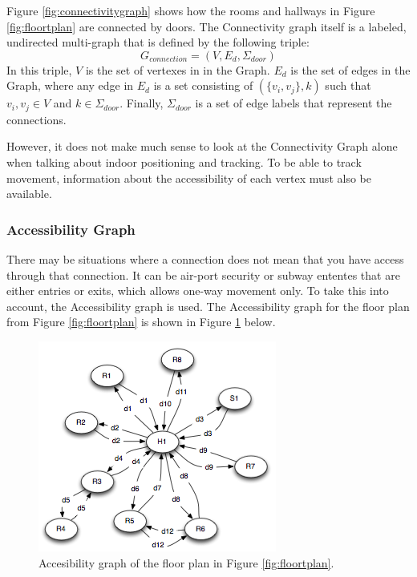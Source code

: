 Figure \ref{fig:connectivitygraph} shows how the rooms and hallways in Figure \ref{fig:floortplan} are connected by doors. 
The Connectivity graph itself is a labeled, undirected multi-graph that is defined by the following triple: \\

\begin{equation}
G_{connection} = (V, E_d, \Sigma_{door})
\end{equation}
In this triple, $V$ is the set of vertexes in in the Graph. 
$E_d$ is the set of edges in the Graph, where any edge in $E_d$ is a set consisting of $(\{v_i, v_j\}, k)$ such that $v_i, v_j \in V$ and $k \in \Sigma_{door}$.
Finally, $\Sigma_{door}$ is a set of edge labels that represent the connections. 

However, it does not make much sense to look at the Connectivity Graph alone when talking about indoor positioning and tracking. 
To be able to track movement, information about the accessibility of each vertex must also be available. 

\subsubsection{ \quad Accessibility Graph}
There may be situations where a connection does not mean that you have access through that connection.
It can be air-port security or subway ententes that are either entries or exits, which allows one-way movement only.
To take this into account, the Accessibility graph is used. 
The Accessibility graph for the floor plan from Figure \ref{fig:floortplan} is shown in Figure \ref{fig:accesibbilitygraph} below.

\begin{figure}[]%
\centering
\includegraphics[width=0.8\columnwidth]{images/accessibilitygraph.png}%
\caption{Accesibility graph of the floor plan in Figure \ref{fig:floortplan}.} %
\label{fig:accesibbilitygraph}%
\end{figure}%


